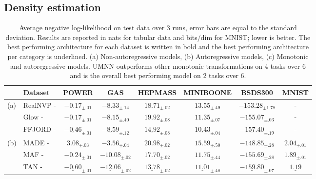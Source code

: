 \subsection{Density estimation}

\begin{table}
    \caption{Average negative log-likelihood on test data over 3 runs, error bars are equal to the standard deviation.
    Results are reported in nats for tabular data and bits/dim for MNIST; lower is better.
    The best performing architecture for each dataset is written in bold and the best performing architecture per category is underlined.
    (a) Non-autoregressive models, (b) Autoregressive models, (c) Monotonic and autoregressive models.
    UMNN outperforms other monotonic transformations on 4 tasks over 6 and is the overall best performing model on 2 tasks over 6.
    }\label{tab:tabular_density}
    \centering
    \scriptsize
    \setlength{\tabcolsep}{1pt}
    \renewcommand{\arraystretch}{1.5}

    \begin{tabular}{l l c c c c c c }
        \hline
        &Dataset & \textbf{POWER} & \textbf{GAS} & \textbf{HEPMASS} & \textbf{MINIBOONE} & \textbf{BSDS300} & \textbf{MNIST} \\
        \hline

        \multirow{3}{*}{(a)} &
        RealNVP - \cite{dinh_density_2017} & $-0.17_{\pm.01}$ & $-8.33_{\pm.14}$ & $18.71_{\pm.02}$ & $13.55_{\pm.49}$ & $-153.28_{\pm1.78}$ & - \\
        & Glow - \cite{kingma_glow_2018}& $-0.17_{\pm.01}$ & $-8.15_{\pm.40}$ & $19.92_{\pm.08}$ & $11.35_{\pm.07}$ & $-155.07_{\pm.03}$ & - \\
        & FFJORD - \cite{grathwohl_ffjord_2018}& $\underline{-0.46}_{\pm.01}$ & $\underline{-8.59}_{\pm.12}$ & $\underline{14.92}_{\pm.08}$ & $\underline{10.43}_{\pm.04}$ & $\underline{-157.40}_{\pm.19}$ & - \\ \hline

        \multirow{3}{*}{(b)}
        & MADE - \cite{germain_made_2015}& $3.08_{\pm.03}$ & $-3.56_{\pm.04}$ & $20.98_{\pm.02}$ & $15.59_{\pm.50}$ & $-148.85_{\pm.28}$ & $2.04_{\pm.01}$\\
        & MAF - \cite{papamakarios_masked_2017} & $-0.24_{\pm.01}$ & $-10.08_{\pm.02}$ & $17.70_{\pm.02}$ & $11.75_{\pm.44}$ & $-155.69_{\pm.28}$ & $1.89_{\pm.01}$\\
        & TAN - \cite{oliva_transformation_2018}& $\underline{-0.60}_{\pm.01}$ & $\mathbf{\underline{-12.06}}_{\pm.02}$ & $\mathbf{\underline{13.78}}_{\pm.02}$ & $\underline{11.01}_{\pm.48}$ & $\mathbf{\underline{-159.80}}_{\pm.07}$ & $\underline{1.19}$\\\hline


\end{tabular}
\end{table}
